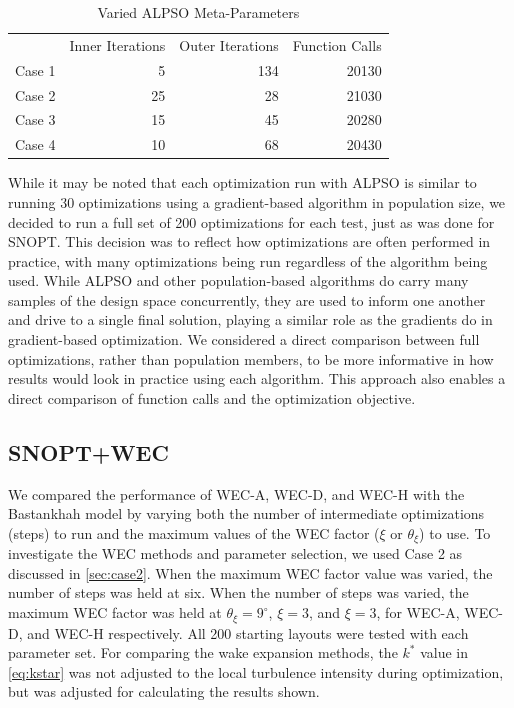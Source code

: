 \documentclass{jpconf}
\begin{document}
\begin{table}[h!]
	\centering
	\caption{Varied ALPSO Meta-Parameters}
	\label{tab:alpsoparams}
	\begin{tabular}{lrrr}
		\toprule
		{} & Inner Iterations & Outer Iterations & Function Calls\\
		\cmidrule(lr){2-4}
		Case 1 &  5  & 134 & 20130 \\
		Case 2 & 25 & 28  & 21030 \\
		Case 3 & 15 & 45 & 20280 \\
		Case 4 & 10 & 68 & 20430 \\
		\bottomrule
	\end{tabular}
\end{table}

While it may be noted that each optimization run with ALPSO is similar to running 30 optimizations using a gradient-based algorithm in population size, we decided to run a full set of 200 optimizations for each test, just as was done for SNOPT. This decision was to reflect how optimizations are often performed in practice, with many optimizations being run regardless of the algorithm being used. While ALPSO and other population-based algorithms do carry many samples of the design space concurrently, they are used to inform one another and drive to a single final solution, playing a similar role as the gradients do in gradient-based optimization. We considered a direct comparison between full optimizations, rather than population members, to be more informative in how results would look in practice using each algorithm. This approach also enables a direct comparison of function calls and the optimization objective.

\subsection{SNOPT+WEC}\label{sec:bpa_wec_comparison}

We compared the performance of WEC-A, WEC-D, and WEC-H with the Bastankhah  model by varying both the number of intermediate optimizations (steps) to run and the maximum values of the WEC factor ($\xi$ or $\theta_\xi$) to use. To investigate the WEC methods and parameter selection, we used Case 2 as discussed in \cref{sec:case2}. When the maximum WEC factor value was varied, the number of steps was held at six. When the number of steps was varied, the maximum WEC factor was held at $\theta_\xi = 9 ^\circ$, $\xi=3$, and $\xi=3$, for WEC-A, WEC-D, and WEC-H respectively. All 200 starting layouts were tested with each parameter set. For comparing the wake expansion methods, the $k^*$ value in \cref{eq:kstar} was not adjusted to the local turbulence intensity during optimization, but was adjusted for calculating the results shown.
\end{document}
